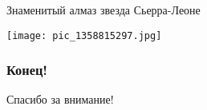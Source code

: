 \documentclass{beamer}
\begin{document}
 \begin{frame}
 Знаменитый алмаз звезда Сьерра-Леоне\par
 \centering\texttt{[image: pic\_1358815297.jpg]}\par
 
 \end{frame}
\begin{frame}
\frametitle{Конец!}
\centering \Large Спасибо за внимание!
\end{frame}
\end{document}
